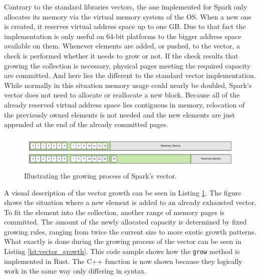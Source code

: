 Contrary to the standard libraries vectors, the one implemented for Spark only allocates its memory via the virtual memory system of the \ac{OS}. When a new one is created, it reserves virtual address space up to one \ac{GB}. Due to that fact the implementation is only useful on 64-bit platforms to the bigger address space available on them. Whenever elements are added, or pushed, to the vector, a check is performed whether it needs to grow or not. If the check results that growing the collection is necessary, physical pages meeting the required capacity are committed. And here lies the different to the standard vector implementation. While normally in this situation memory usage could nearly be doubled, Spark's vector does not need to allocate or reallocate a new block. Because all of the already reserved virtual address space lies contiguous in memory, relocation of the previously owned elements is not needed and the new elements are just appended at the end of the already committed pages.\\

\begin{figure}[h!]
	\centering \includegraphics[width=\linewidth]{PICs/vector_growth.png}
	\caption{Illustrating the growing process of Spark's vector.}
	\label{fig:vector_growth}
\end{figure}

\noindent
A visual description of the vector growth can be seen in Listing \ref{fig:vector_growth}. The figure shows the situation where a new element is added to an already exhausted vector. To fit the element into the collection, another range of memory pages is committed. The amount of the newly allocated capacity is determined by fixed growing rules, ranging from twice the current size to more exotic growth patterns. What exactly is done during the growing process of the vector can be seen in Listing \ref{lst:vector_growth}. This code sample shows how the \texttt{grow} method is implemented in Rust. The C++ function is now shown because they logically work in the same way only differing in syntax.\\


